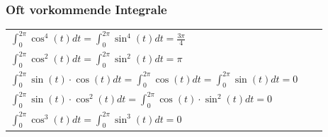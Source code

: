\documentclass[6pt]{article}
\begin{document}
\begin{multicols*}{3}
		\subsubsection*{Oft vorkommende Integrale}

		\begin{doublespace}
			\begin{tabular}{lll}
			$\int_{0}^{2\pi} \cos^4(t) dt =\int_{0}^{2\pi} \sin^4(t) dt = \frac{3\pi}{4}$	 \\
			$\int_{0}^{2\pi} \cos^2(t) dt =\int_{0}^{2\pi} \sin^2(t) dt =\pi$  \\
			$\int_{0}^{2\pi} \sin(t) \cdot \cos(t) dt =\int_{0}^{2\pi} \cos(t) dt =\int_{0}^{2\pi} \sin(t) dt = 0$ \\
			$\int_{0}^{2\pi} \sin(t) \cdot \cos^2(t) dt = \int_{0}^{2\pi} \cos(t) \cdot \sin^2(t) dt =0$ \\
			$\int_{0}^{2\pi} \cos^3(t) dt = \int_{0}^{2\pi} \sin^3(t) dt =0$ \\
			\end{tabular}
		\end{doublespace}
		
		\vspace{145mm}
		
		\pagebreak

\end{multicols*}
\end{document}

